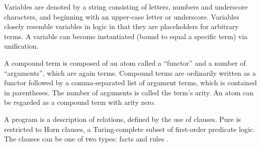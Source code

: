 \documentclass[thesis-solanki.tex]{subfiles}
\begin{document}
Variables are denoted by a string consisting of letters, numbers and underscore characters, and beginning with an
upper-case letter or underscore.
Variables closely resemble variables in logic in that they are placeholders for arbitrary terms.
A variable can become instantiated (bound to equal a specific term) via unification.

A compound term is composed of an atom called a ``functor'' and a number of ``arguments'', which are again terms.
Compound terms are ordinarily written as a functor followed by a comma-separated list of argument terms, which is
contained in parentheses.
The number of arguments is called the term's arity.
An atom can be regarded as a compound term with arity zero.

A  program is a description of relations, defined by the use of clauses.
Pure  is restricted to Horn clauses, a Turing-complete subset of first-order predicate logic.
The clauses can be one of two types: facts and rules \cite{website:prologintroumiami}.

\end{document}
